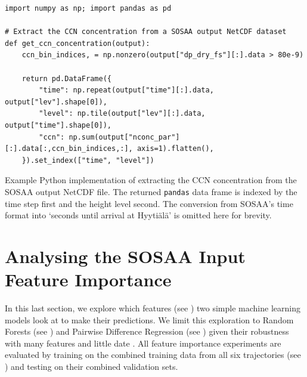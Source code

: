 \begin{listing}[H]
    \capstart %
    \begin{verbatim}
import numpy as np; import pandas as pd

# Extract the CCN concentration from a SOSAA output NetCDF dataset
def get_ccn_concentration(output):
    ccn_bin_indices, = np.nonzero(output["dp_dry_fs"][:].data > 80e-9)

    return pd.DataFrame({
        "time": np.repeat(output["time"][:].data, output["lev"].shape[0]),
        "level": np.tile(output["lev"][:].data, output["time"].shape[0]),
        "ccn": np.sum(output["nconc_par"][:].data[:,ccn_bin_indices,:], axis=1).flatten(),
    }).set_index(["time", "level"])
    \end{verbatim}
    \caption[CCN concentration calculation procedure]{Example Python implementation of extracting the CCN concentration from the SOSAA output NetCDF file. The returned \texttt{pandas} data frame is indexed by the time step first and the height level second. The conversion from SOSAA's time format into `seconds until arrival at Hyyti\"al\"a' is omitted here for brevity.}
    \label{exe:ccn-concentration}
\end{listing}

\section{Analysing the SOSAA Input Feature Importance} \label{txt:feature-importance}

In this last section, we explore which features (see ) two simple machine learning models look at to make their predictions. We limit this exploration to Random Forests (see ) and Pairwise Difference Regression (see ) given their robustness with many features and little date \citeauthor{padre-rf-2021}. All feature importance experiments are evaluated by training on the combined training data from all six trajectories (see ) and testing on their combined validation sets. 

